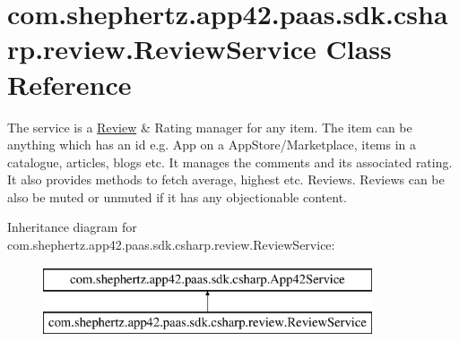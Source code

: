 \hypertarget{classcom_1_1shephertz_1_1app42_1_1paas_1_1sdk_1_1csharp_1_1review_1_1_review_service}{\section{com.\+shephertz.\+app42.\+paas.\+sdk.\+csharp.\+review.\+Review\+Service Class Reference}
\label{classcom_1_1shephertz_1_1app42_1_1paas_1_1sdk_1_1csharp_1_1review_1_1_review_service}
}


The service is a \hyperlink{classcom_1_1shephertz_1_1app42_1_1paas_1_1sdk_1_1csharp_1_1review_1_1_review}{Review} \& Rating manager for any item. The item can be anything which has an id e.\+g. App on a App\+Store/\+Marketplace, items in a catalogue, articles, blogs etc. It manages the comments and its associated rating. It also provides methods to fetch average, highest etc. Reviews. Reviews can be also be muted or unmuted if it has any objectionable content.  


Inheritance diagram for com.\+shephertz.\+app42.\+paas.\+sdk.\+csharp.\+review.\+Review\+Service\+:\begin{figure}[H]
\begin{center}
\leavevmode
\includegraphics[height=2.000000cm]{classcom_1_1shephertz_1_1app42_1_1paas_1_1sdk_1_1csharp_1_1review_1_1_review_service}
\end{center}
\end{figure}
